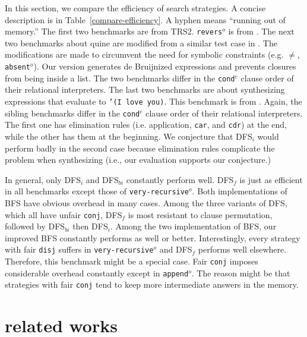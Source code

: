 \documentclass[format=acmlarge, review=true, authordraft=true]{acmart}
\newcommand{\conde}{\texttt{cond$^e$}}
\newcommand{\conj}{\texttt{conj}}
\newcommand{\disj}{\texttt{disj}}
\newcommand{\veryrecursiveo}{\texttt{very-recursive$^o$}}
\newcommand{\appendo}{\texttt{append$^o$}}
\newcommand{\reverso}{\texttt{revers$^o$}}
\newcommand{\DFSi }[0]{DFS$_{i}$}
\newcommand{\DFSf }[0]{DFS$_{f}$}
\newcommand{\DFSbi}[0]{DFS$_{bi}$}
\newcommand{\BFS}[0]{BFS}
\begin{document}
In this section, we compare the efficiency of search strategies. A concise 
description is in Table~\ref{compare-efficiency}. A hyphen means ``running out
of memory.'' The first two benchmarks are from 
TRS2. \reverso{} is from 
\citet{rozplokhas2018improving}. The next two benchmarks 
about quine are modified from a similar test case in \citet{byrd2017unified}. 
The modifications are made 
to circumvent the need for symbolic constraints (e.g. $\neq$, 
\texttt{absent$^o$}). Our version generates de 
Bruijnized expressions and prevents closures from being inside a list. The two 
benchmarks differ in the \conde{} clause order of their relational 
interpreters. 
The last two 
benchmarks are about synthesizing expressions that evaluate to \texttt{'(I love 
you)}. This benchmark is from \citet{byrd2017unified}. Again, the 
sibling benchmarks differ in the \conde{} clause order of their relational 
interpreters. The first one 
has elimination rules (i.e. application, \texttt{car}, and \texttt{cdr}) at the 
end, while the other has them at the beginning. We conjecture that \DFSi{} 
would 
perform badly in the second case because elimination rules complicate the 
problem when synthesizing (i.e., our evaluation supports our conjecture.)


In general, only \DFSi{} and \DFSbi{} constantly perform well. \DFSf{}
is just as efficient in all benchmarks except those of \veryrecursiveo. Both
implementations of BFS have obvious overhead in many cases. Among the
three variants of DFS, which all have unfair \conj{}, \DFSf{} is most
resistant to clause permutation, followed by \DFSbi{} then
\DFSi{}. Among the two implementation of BFS, our improved \BFS{}
constantly performs as well or better. Interestingly, every strategy
with fair \disj{} suffers in \veryrecursiveo{} and \DFSf{} performs
well elsewhere. Therefore, this benchmark might be a special
case. Fair \conj{} imposes considerable overhead constantly except in
\appendo. The reason might be that strategies with fair \conj{} tend
to keep more intermediate answers in the memory.

\section{related works}
\end{document}
